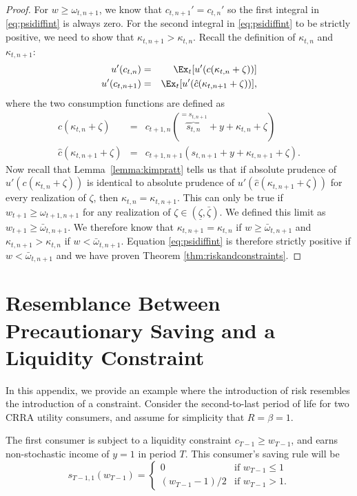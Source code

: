 \documentclass[titlepage]{\econtex}
\providecommand{\wAlt}{\omega}
\begin{document}
\begin{proof}
	For ${w} \geq \wAlt_{t,n+1}$, we know that $c_{t,n+1}' = c_{t,n}'$ so the first integral in \eqref{eq:psidiffint} is always zero. For the second integral in \eqref{eq:psidiffint} to be strictly positive, we need to show that $\kappa_{t,n+1} > \kappa_{t,n}$. Recall the definition of $\kappa_{t,n}$ and $\kappa_{t,n+1}$:
	\begin{eqnarray*}
		u'({c}_{t,n}) & = & \Ex_{t}[u'(c(\kappa_{t,n}+\zeta))]
		\\  u'({c}_{t,n+1}) & = & \Ex_{t}[u'(\hat{c}(\kappa_{t,n+1}+\zeta))],
	\end{eqnarray*}
	where the two consumption functions are defined as
	\begin{eqnarray}
	c(\kappa_{t,n}+\zeta) & = & c_{t+1,n}(\overbrace{{s}_{t,n}}^{={s}_{t,n+1}}+{y}+\kappa_{t,n}+\zeta) \label{eq:cnoconstr2}
	\\  \hat{c}(\kappa_{t,n+1}+\zeta) & = & c_{t+1,n+1}({s}_{t,n+1}+{y}+\kappa_{t,n+1}+\zeta)\label{eq:gravecnoconstr2}.
	\end{eqnarray}
	Now recall that Lemma~\ref{lemma:kimpratt} tells us that if absolute prudence of $u'(c(\kappa_{t,n}+\zeta))$ is identical to absolute prudence of $u'(\hat{c}(\kappa_{t,n+1}+\zeta))$ for every realization of $\zeta$, then $\kappa_{t,n}=\kappa_{t,n+1}$. This can only be true if $w_{t+1} \geq \wAlt_{t+1,n+1}$ for any realization of $\zeta \in (\underline{\zeta}, \bar{\zeta})$. We defined this limit as $w_{t+1} \geq {\bar{\wAlt}}_{t,n+1}$. We therefore know that $\kappa_{t,n+1}  = \kappa_{t,n}$ if ${w} \geq {\bar{\wAlt}}_{t,n+1}$ and $\kappa_{t,n+1} > \kappa_{t,n}$ if ${w} < {\bar{\wAlt}}_{t,n+1}$. Equation \eqref{eq:psidiffint} is therefore strictly positive if ${w} < {\bar{\wAlt}}_{t,n+1}$ and we have proven Theorem \ref{thm:riskandconstraints}.
	



\end{proof}

\section{Resemblance Between Precautionary Saving and a Liquidity Constraint} \label{app:similar}
In this appendix, we provide an example where the introduction of risk resembles the introduction of a constraint. Consider the second-to-last period of life for two CRRA utility consumers, and assume for simplicity that $R=\beta=1$.

The first consumer is subject to a liquidity constraint $c_{T-1} \geq w_{T-1}$, and earns non-stochastic income of ${y}=1$ in period $T$. This consumer's saving rule will be 
\begin{equation*}
s_{T-1,1}(w_{T-1}) =
\begin{cases}
0   & \mbox{if $w_{T-1} \leq 1$}
\\    (w_{T-1}-1)/2 & \mbox{if $w_{T-1} > 1$}.
\end{cases}
\end{equation*}
\end{document}
